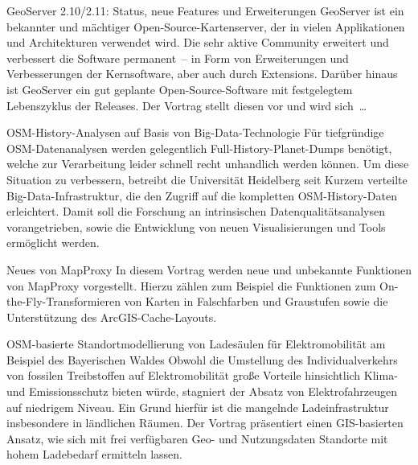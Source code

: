%
{GeoServer 2.10/2.11: Status, neue Features und Erweiterungen}%
{}%
{GeoServer ist ein bekannter und mächtiger Open-Source-Kartenserver, der in
vielen Applikationen und Architek\-turen verwendet wird.
Die sehr aktive Community erweitert und verbessert die Software
permanent~-- in Form von Erweiterungen und Verbesserungen der Kernsoftware, aber
auch durch Extensions.
Darüber hinaus ist GeoServer ein gut geplante Open-Source-Software mit
festgelegtem Lebenszyklus der Releases. Der Vortrag
stellt diesen vor und wird
sich~\dots %
}


%
{OSM-History-Analysen auf Basis von Big-Data-Technologie}%
{}%
{Für tiefgründige OSM-Datenanalysen werden gelegentlich Full-History-Planet-Dumps benötigt, welche zur
Verarbeitung leider schnell recht unhandlich werden können. Um diese Situation zu verbessern,
betreibt die Universität Heidelberg seit Kurzem verteilte Big-Data-Infrastruktur, die den Zugriff
auf die kompletten OSM-History-Daten erleichtert. Damit soll die Forschung an intrinsischen
Datenqualitätsanalysen vorangetrieben, sowie die Entwicklung von neuen Visualisierungen und Tools
ermöglicht werden.}%

%
{Neues von MapProxy}%
{}%
{In diesem Vortrag werden neue und unbekannte Funktionen von MapProxy vorgestellt. Hierzu zählen zum
Beispiel die Funktionen zum On-the-Fly-Transformieren von Karten in Falschfarben und Graustufen
sowie die Unterstützung des ArcGIS-Cache-Layouts.}

%
{OSM-basierte Standortmodellierung von Ladesäulen für Elektromobilität am Beispiel des Bayerischen Waldes}%
{}%
{Obwohl die Umstellung des Individualverkehrs von fossilen Treibstoffen auf Elektromobilität große
Vorteile hinsichtlich Klima- und Emissionsschutz bieten würde, stagniert der Absatz von
Elektrofahrzeugen auf niedrigem Niveau. Ein Grund hierfür ist die mangelnde Ladeinfrastruktur
insbesondere in ländlichen Räumen. Der Vortrag präsentiert einen GIS-basierten Ansatz, wie sich mit
frei verfügbaren Geo- und Nutzungsdaten Standorte mit hohem Ladebedarf ermitteln lassen.}

\vspace{-0.4\baselineskip}
\enlargethispage{0.4\baselineskip}

